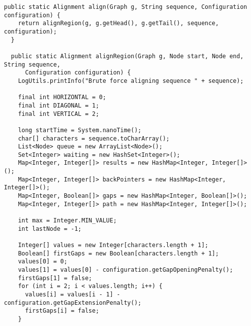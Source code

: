 \documentclass[thesis.tex]{subfiles}
\begin{document}
\begin{lstlisting}
public static Alignment align(Graph g, String sequence, Configuration configuration) {
    return alignRegion(g, g.getHead(), g.getTail(), sequence, configuration);
  }

  public static Alignment alignRegion(Graph g, Node start, Node end, String sequence,
      Configuration configuration) {
    LogUtils.printInfo("Brute force aligning sequence " + sequence);

    final int HORIZONTAL = 0;
    final int DIAGONAL = 1;
    final int VERTICAL = 2;

    long startTime = System.nanoTime();
    char[] characters = sequence.toCharArray();
    List<Node> queue = new ArrayList<Node>();
    Set<Integer> waiting = new HashSet<Integer>();
    Map<Integer, Integer[]> results = new HashMap<Integer, Integer[]>();
    Map<Integer, Integer[]> backPointers = new HashMap<Integer, Integer[]>();
    Map<Integer, Boolean[]> gaps = new HashMap<Integer, Boolean[]>();
    Map<Integer, Integer[]> path = new HashMap<Integer, Integer[]>();

    int max = Integer.MIN_VALUE;
    int lastNode = -1;

    Integer[] values = new Integer[characters.length + 1];
    Boolean[] firstGaps = new Boolean[characters.length + 1];
    values[0] = 0;
    values[1] = values[0] - configuration.getGapOpeningPenalty();
    firstGaps[1] = false;
    for (int i = 2; i < values.length; i++) {
      values[i] = values[i - 1] - configuration.getGapExtensionPenalty();
      firstGaps[i] = false;
    }


\end{lstlisting}
\end{document}

